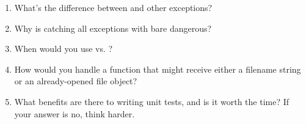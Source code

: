 \begin{ponder}
\begin{enumerate}
    \item What's the difference between  and other exceptions?
    \item Why is catching all exceptions with bare  dangerous?
    \item When would you use  vs. ?
    \item How would you handle a function that might receive either a filename string or an already-opened file object?
    \item What benefits are there to writing unit tests, and is it worth the time? If your answer is no, think harder.
\end{enumerate}
\end{ponder}
